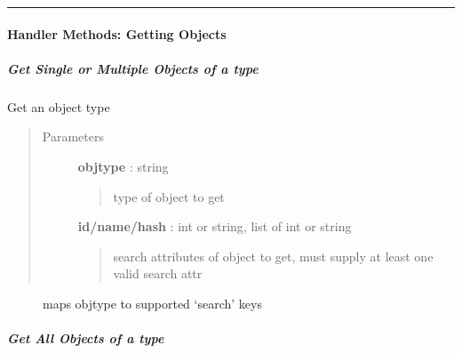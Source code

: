 \documentclass[letterpaper,10pt,english]{sphinxmanual}
\begin{document}
\bigskip\hrule{}\bigskip



\paragraph{Handler Methods: Getting Objects}
\label{pytan.handler:handler-methods-getting-objects}

\subparagraph{Get Single or Multiple Objects of a type}
\label{pytan.handler:get-single-or-multiple-objects-of-a-type}

\begin{fulllineitems}
\label{pytan.handler:pytan.handler.Handler.get}
Get an object type
\begin{quote}\begin{description}
\item[{Parameters}] \leavevmode
\textbf{objtype} : string
\begin{quote}

type of object to get
\end{quote}

\textbf{id/name/hash} : int or string, list of int or string
\begin{quote}

search attributes of object to get, must supply at least one valid search attr
\end{quote}

\end{description}\end{quote}



\begin{description}
\item[{{\hyperref[pytan.constants:pytan.constants.GET_OBJ_MAP]{}}}] \leavevmode
maps objtype to supported `search' keys

\end{description}



\end{fulllineitems}



\subparagraph{Get All Objects of a type}
\label{pytan.handler:get-all-objects-of-a-type}
\end{document}
